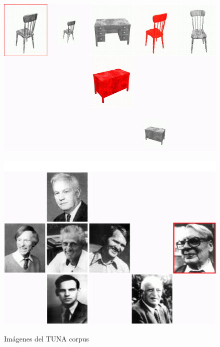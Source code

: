\begin{figure}[!ht]
\begin{minipage}[c][][b]{0.5\textwidth}
\centering
\includegraphics[width=\textwidth]{images/largeGreyChair.jpg}\\[0pt]
\caption{}
\label{fig-TUNA-furniture}
\vspace*{.1cm}
\end{minipage}
\hspace*{0cm}
\begin{minipage}[c][][b]{0.5\textwidth}
\centering
\includegraphics[width=\textwidth]{images/tuna-people.jpg}\\[0pt]
\caption{}
\label{fig-TUNA-people}
\end{minipage}
\caption{Im\'agenes del TUNA corpus}
\end{figure}


